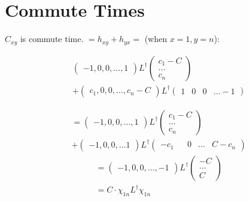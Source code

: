 \section{Commute Times}
$C_{xy}$ is commute time. $=h_{xy} + h_{yx} = $ (when $x = 1, y = n$):

\begin{align}
  &
  \begin{pmatrix} -1 , 0 , 0 , \ldots , 1\end{pmatrix} L^\dag
    \begin{pmatrix} c_1 - C \\ \ldots\\ c_n \end{pmatrix}
      \\
  &+
  \begin{pmatrix} c_1 , 0, 0 , \ldots , c_n-C\end{pmatrix} L^\dag
    \begin{pmatrix} 1 & 0 & 0 & \ldots -1 \end{pmatrix}
\end{align}

\begin{align}
  &
  = \begin{pmatrix} -1 , 0 , 0 , \ldots , 1\end{pmatrix} L^\dag
    \begin{pmatrix} c_1 - C \\ \ldots\\ c_n \end{pmatrix}
      \\
  &+
  \begin{pmatrix} -1 , 0 , 0 , \ldots 1 \end{pmatrix} L^\dag
    \begin{pmatrix} -c_1 &  & 0 & \ldots & C-c_n\end{pmatrix}
\end{align}
\begin{align}
  &
  = \begin{pmatrix} -1 , 0 , 0 , \ldots , -1\end{pmatrix} L^\dag
    \begin{pmatrix} - C \\ \ldots\\ C \end{pmatrix}
  \\
  &= C \cdot \chi_{1n} L^\dag \chi_{1n}
\end{align}
